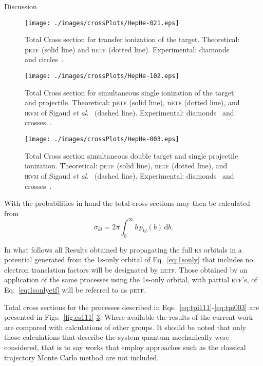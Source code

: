 \documentclass[aps, pra, reprint, groupedaddress, amsfonts,
               amsmath, amssymb, showpacs, nofootinbib]{revtex4-1}
\begin{document}
\begin{section}{Discussion \label{sec:disc}}
   \begin{figure}[t]
      \centering
      \texttt{[image: ./images/crossPlots/HepHe-021.eps]}
      \caption{Total Cross section for transfer ionization of the target.
               Theoretical: p\textsc{etf} (solid line) and n\textsc{etf} (dotted line).
               Experimental: diamonds~\cite{Dub-89} and circles~\cite{FTFHLP-95}. \label{fig:cs021}}
   \end{figure}
   \begin{figure}[t]
      \centering
      \texttt{[image: ./images/crossPlots/HepHe-102.eps]}
      \caption{Total Cross section for simultaneous single ionization of the target and projectile.
               Theoretical: p\textsc{etf} (solid line), n\textsc{etf} (dotted line), and
                            \textsc{ievm} of Sigaud \textit{et al}.~\cite{SM-03} (dashed line).
               Experimental: diamonds~\cite{Dub-89} and crosses~\cite{SSMSM-11}. \label{fig:cs102}}
   \end{figure}

   \begin{figure}[t]
      \centering
      \texttt{[image: ./images/crossPlots/HepHe-003.eps]}
      \caption{Total Cross section simultaneous double target and single projectile ionization.
               Theoretical: p\textsc{etf} (solid line), n\textsc{etf} (dotted line), and
               \textsc{ievm} of Sigaud \textit{et al}.~\cite{SM-03} (dashed line).
               Experimental: diamonds~\cite{Dub-89} and crosses~\cite{SSMSM-11}. \label{fig:cs003}}
   \end{figure}

   With the probabilities in hand the total cross sections may then be calculated from
   \begin{equation} \label{eq:cross}
      \sigma_{kl} = 2 \pi \int_0^\infty b \, p_{kl}(b) \, \mathrm{d}b.
   \end{equation}

   In what follows all Results obtained by propagating the full \textsc{ks} orbitals in a potential
   generated from the 1s-only orbital of Eq.~\eqref{eq:1sonly} that includes no electron translation
   factors will be designated by n\textsc{etf}. Those obtained by an application of the same processes
   using the 1s-only orbital, with partial \textsc{etf}'s, of Eq.~\eqref{eq:1sonlyetf} will be referred
   to as p\textsc{etf}.
   
   Total cross sections for the processes described in
   Eqs.~\eqref{eq:tpi111}-\eqref{eq:tpi003} are presented in Figs.~\ref{fig:cs111}-\ref{fig:cs003}.
   Where available the results of the current work are compared with calculations of other groups. It
   should be noted that only those calculations that describe the system quantum mechanically were
   considered, that is to say works that employ approaches such as the classical trajectory Monte Carlo
   method are not included.


\end{section}
\end{document}
